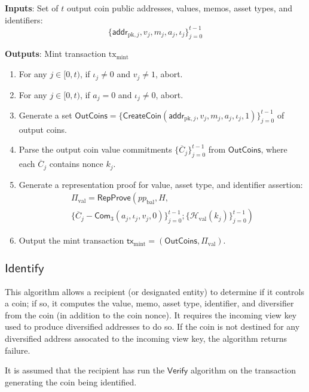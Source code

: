 \documentclass{article}
\newcommand{\func}[1]{\mathsf{#1}}
\newcommand{\addr}{\func{addr}}
\newcommand{\com}{\func{Com}}
\newcommand{\hash}{\mathcal{H}}
\begin{document}
\textbf{Inputs}: Set of $t$ output coin public addresses, values, memos, asset types, and identifiers: $$\{\addr_{\text{pk},j}, v_j, m_j, a_j, \iota_j\}_{j=0}^{t-1}$$

\textbf{Outputs}: Mint transaction $\text{tx}_{\text{mint}}$

\begin{enumerate}
    \item For any $j \in [0, t)$, if $\iota_j \neq 0$ and $v_j \neq 1$, abort.
    \item For any $j \in [0, t)$, if $a_j = 0$ and $\iota_j \neq 0$, abort.
    \item Generate a set $\func{OutCoins} = \{\func{CreateCoin}(\addr_{\text{pk},j}, v_j, m_j, a_j, \iota_j, 1)\}_{j=0}^{t-1}$ of output coins.
    \item Parse the output coin value commitments $\{\overline{C}_j\}_{j=0}^{t-1}$ from $\func{OutCoins}$, where each $\overline{C}_j$ contains nonce $k_j$.
    \item Generate a representation proof for value, asset type, and identifier assertion:
    \begin{multline*}
        \Pi_{\text{val}} = \func{RepProve}\left( pp_{\text{bal}}, H, \right. \\
        \left. \{ \overline{C}_j - \com_3(a_j, \iota_j, v_j, 0) \}_{j=0}^{t-1}; \{\hash_{\text{val}}(k_j)\}_{j=0}^{t-1} \right)
    \end{multline*}
    \item Output the mint transaction $\func{tx}_{\text{mint}} = (\func{OutCoins}, \Pi_{\text{val}})$.
\end{enumerate}


\subsection{\texorpdfstring{$\func{Identify}$}{Identify}}

This algorithm allows a recipient (or designated entity) to determine if it controls a coin; if so, it computes the value, memo, asset type, identifier, and diversifier from the coin (in addition to the coin nonce).
It requires the incoming view key used to produce diversified addresses to do so.
If the coin is not destined for any diversified address assocated to the incoming view key, the algorithm returns failure.

It is assumed that the recipient has run the $\func{Verify}$ algorithm on the transaction generating the coin being identified.
\end{document}
